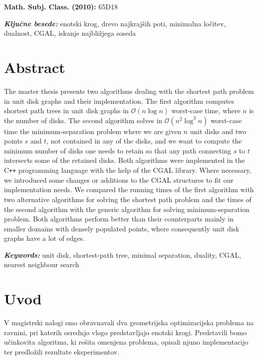 \documentclass[a4paper, 12pt]{book}
\newcommand{\OO}{\ensuremath{\mathcal{O}}} %
\newcommand{\clearemptydoublepage}{\newpage{\pagestyle{empty}\cleardoublepage}}
\begin{document}
\begin{flushleft}
\textbf{Math. Subj. Class. (2010): } 65D18

\textbf{\textit{Ključne besede: }}enotski krog, drevo najkrajših poti, minimalna ločitev, dualnost, CGAL, iskanje najbližjega soseda
\end{flushleft}

\chapter*{Abstract}
The master thesis presents two algorithms dealing with the shortest path problem in unit disk graphs and their implementation. The first algorithm computes shortest path trees in unit disk graphs in $\OO(n\log n)$ worst-case time, where $n$ is the number of disks. The second algorithm solves in $\OO(n^2\log^3n)$ worst-case time the minimum-separation problem where we are given $n$ unit disks and two points $s$ and $t$, not contained in any of the disks, and we want to compute the minimum number of disks one needs to retain so that any path connecting $s$ to $t$ intersects some of the retained disks. Both algorithms were implemented in the C\texttt{+}\texttt{+} programming language with the help of the CGAL library. Where necessary, we introduced some changes or additions to the CGAL structures to fit our implementation needs. We compared the running times of the first algorithm with two alternative algorithms for solving the shortest path problem and the times of the second algorithm with the generic algorithm for solving minimum-separation problem. Both algorithms perform better than their counterparts mainly in smaller domains with densely populated points, where consequently unit disk graphs have a lot of edges.
\bigbreak

\begin{flushleft}
\textbf{\textit{Keywords: }}unit disk, shortest-path tree, minimal separation, duality, CGAL, nearest neighbour search
\end{flushleft}


\clearemptydoublepage

\mainmatter
\setcounter{page}{1}
\pagestyle{fancy}

\chapter{Uvod}
V magistrski nalogi smo obravnavali dva geometrijska optimizacijska problema na ravnini, pri katerih osrednjo vlogo predstavljajo enotski krogi. Predstavili bomo učinkovita algoritma, ki rešita omenjena problema, opisali njuno implementacijo ter predložili rezultate eksperimentov.
\end{document}

